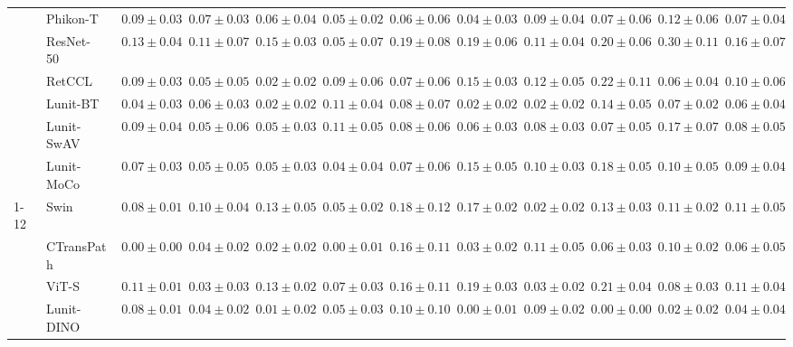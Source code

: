 \begin{tabular}{ll|cccc|c|cccc|c}
 & Phikon-T~\cite{filiot2023scaling} & $0.09 \pm 0.03$ & $0.07 \pm 0.03$ & $0.06 \pm 0.04$ & $0.05 \pm 0.02$ & $0.06 \pm 0.06$ & $0.04 \pm 0.03$ & $0.09 \pm 0.04$ & $0.07 \pm 0.06$ & $0.12 \pm 0.06$ & $0.07 \pm 0.04$ \\
 & ResNet-50~\cite{he2015deep} & $0.13 \pm 0.04$ & $0.11 \pm 0.07$ & $0.15 \pm 0.03$ & $0.05 \pm 0.07$ & $0.19 \pm 0.08$ & $0.19 \pm 0.06$ & $0.11 \pm 0.04$ & $0.20 \pm 0.06$ & $0.30 \pm 0.11$ & $0.16 \pm 0.07$ \\
 & RetCCL~\cite{wang2023retccl} & $0.09 \pm 0.03$ & $0.05 \pm 0.05$ & $0.02 \pm 0.02$ & $0.09 \pm 0.06$ & $0.07 \pm 0.06$ & $0.15 \pm 0.03$ & $0.12 \pm 0.05$ & $0.22 \pm 0.11$ & $0.06 \pm 0.04$ & $0.10 \pm 0.06$ \\
 & Lunit-BT~\cite{kang2023benchmarking} & $0.04 \pm 0.03$ & $0.06 \pm 0.03$ & $\mathbf{0.02 \pm 0.02}$ & $0.11 \pm 0.04$ & $0.08 \pm 0.07$ & $0.02 \pm 0.02$ & $\mathbf{0.02 \pm 0.02}$ & $0.14 \pm 0.05$ & $0.07 \pm 0.02$ & $0.06 \pm 0.04$ \\
 & Lunit-SwAV~\cite{kang2023benchmarking} & $0.09 \pm 0.04$ & $0.05 \pm 0.06$ & $0.05 \pm 0.03$ & $0.11 \pm 0.05$ & $0.08 \pm 0.06$ & $0.06 \pm 0.03$ & $0.08 \pm 0.03$ & $0.07 \pm 0.05$ & $0.17 \pm 0.07$ & $0.08 \pm 0.05$ \\
 & Lunit-MoCo~\cite{kang2023benchmarking} & $0.07 \pm 0.03$ & $0.05 \pm 0.05$ & $0.05 \pm 0.03$ & $0.04 \pm 0.04$ & $0.07 \pm 0.06$ & $0.15 \pm 0.05$ & $0.10 \pm 0.03$ & $0.18 \pm 0.05$ & $0.10 \pm 0.05$ & $0.09 \pm 0.04$ \\
\cline{1-12}
\multirow[t]{12}{*}{Mean pool} & Swin~\cite{liu2021swin} & $0.08 \pm 0.01$ & $0.10 \pm 0.04$ & $0.13 \pm 0.05$ & $0.05 \pm 0.02$ & $0.18 \pm 0.12$ & $0.17 \pm 0.02$ & $\mathbf{0.02 \pm 0.02}$ & $0.13 \pm 0.03$ & $0.11 \pm 0.02$ & $0.11 \pm 0.05$ \\
 & CTransPath~\cite{wang2022transformer} & $\mathbf{0.00 \pm 0.00}$ & $0.04 \pm 0.02$ & $0.02 \pm 0.02$ & $\mathbf{0.00 \pm 0.01}$ & $0.16 \pm 0.11$ & $0.03 \pm 0.02$ & $0.11 \pm 0.05$ & $0.06 \pm 0.03$ & $0.10 \pm 0.02$ & $0.06 \pm 0.05$ \\
 & ViT-S~\cite{kolesnikov2021image} & $0.11 \pm 0.01$ & $0.03 \pm 0.03$ & $0.13 \pm 0.02$ & $0.07 \pm 0.03$ & $0.16 \pm 0.11$ & $0.19 \pm 0.03$ & $0.03 \pm 0.02$ & $0.21 \pm 0.04$ & $0.08 \pm 0.03$ & $0.11 \pm 0.04$ \\
 & Lunit-DINO~\cite{kang2023benchmarking} & $0.08 \pm 0.01$ & $0.04 \pm 0.02$ & $\mathbf{0.01 \pm 0.02}$ & $0.05 \pm 0.03$ & $\mathbf{0.10 \pm 0.10}$ & $\mathbf{0.00 \pm 0.01}$ & $0.09 \pm 0.02$ & $\mathbf{0.00 \pm 0.00}$ & $\mathbf{0.02 \pm 0.02}$ & $\mathbf{0.04 \pm 0.04}$ \\

\end{tabular}
